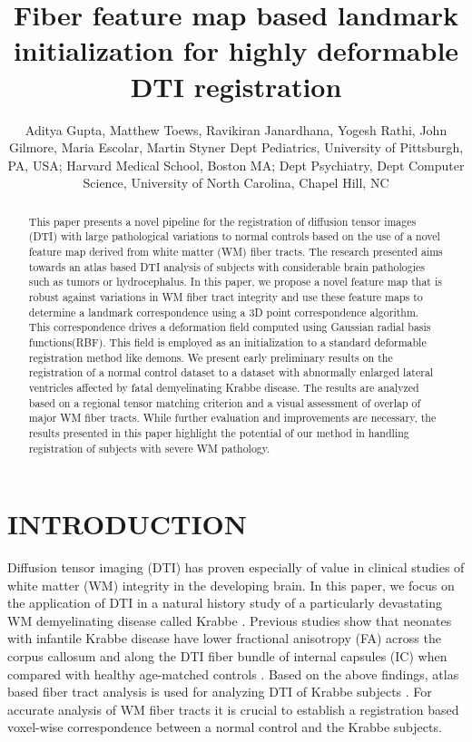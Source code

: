 \documentclass[]{spie}  %
\title{Fiber feature map based landmark initialization for highly deformable DTI registration}
\author{Aditya Gupta\supit{a,c}, Matthew Toews\supit{b}, Ravikiran Janardhana\supit{d}, Yogesh Rathi\supit{b}, John Gilmore\supit{c}, Maria Escolar\supit{a}, Martin Styner\supit{c,d}
\skiplinehalf
\supit{a} Dept Pediatrics, University of Pittsburgh, PA, USA; \supit{b} Harvard Medical School, Boston MA; \supit{c} Dept Psychiatry, \supit{d} Dept Computer Science, University of North Carolina, Chapel Hill, NC
}
\begin{document}
 
  \maketitle 

\begin{abstract}
This paper presents a novel pipeline for the registration of diffusion tensor images (DTI) with large pathological variations to normal controls based on the use of a novel feature map derived from white matter (WM) fiber tracts. The research presented aims towards an atlas based DTI analysis of subjects with considerable brain pathologies such as  tumors or hydrocephalus. In this paper, we propose a novel feature map that is robust against variations in WM fiber tract integrity and use these feature maps to determine a landmark correspondence using a 3D point correspondence algorithm. This correspondence drives a deformation field computed using Gaussian radial basis functions(RBF). This field is employed as an initialization to a standard deformable registration method like demons. We present early preliminary results on  the registration of a normal control dataset to a dataset with abnormally enlarged lateral ventricles affected by  fatal demyelinating Krabbe disease. The results are analyzed based on a regional tensor matching criterion and a visual assessment of overlap of major WM fiber tracts. While further evaluation and improvements are necessary, the results presented in this paper highlight the potential of our method in handling registration of subjects with severe WM pathology.
\end{abstract}


\section{INTRODUCTION}
\label{sec:intro}  %

Diffusion tensor imaging (DTI) has proven especially of value in clinical studies of white matter (WM) integrity in the developing brain. In this paper, we focus on the application of DTI in a natural history study of a particularly devastating WM demyelinating disease called Krabbe \cite{Escolar09}. Previous studies show that neonates with infantile Krabbe disease have lower fractional anisotropy (FA) across the corpus callosum and along the DTI fiber bundle of internal capsules (IC) when compared with healthy age-matched controls \cite{Guo01}. Based on the above findings, atlas based fiber tract analysis is used for analyzing DTI of Krabbe subjects \cite{Goodlett06}. For accurate analysis of WM fiber tracts it is crucial to establish a registration based voxel-wise correspondence between a normal control and the Krabbe subjects. 
\end{document}
